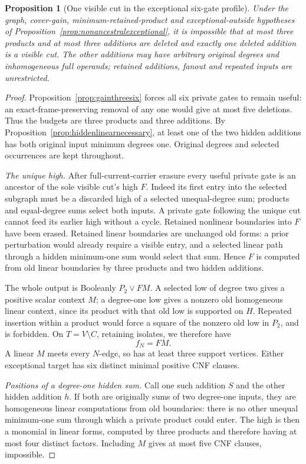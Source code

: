 \documentclass[11pt]{article}
\newtheorem{proposition}[theorem]{Proposition}
\theoremstyle{definition}
\theoremstyle{remark}
\begin{document}
\begin{proposition}[One visible cut in the exceptional six-gate profile]\label{prop:onevisibleexceptional}
Under the graph, cover-gain, minimum-retained-product and exceptional-outside hypotheses of Proposition~\ref{prop:nonancestralexceptional}, it is impossible that at most three products and at most three additions are deleted and exactly one deleted addition is a visible cut. The other additions may have arbitrary original degrees and inhomogeneous full operands; retained additions, fanout and repeated inputs are unrestricted.
\end{proposition}
\begin{proof}
Proposition~\ref{prop:gainthreesix} forces all six private gates to remain useful: an exact-frame-preserving removal of any one would give at most five deletions. Thus the budgets are three products and three additions. By Proposition~\ref{prop:hiddenlinearnecessary}, at least one of the two hidden additions has both original input minimum degrees one. Original degrees and selected occurrences are kept throughout.

\emph{The unique high.} After full-current-carrier erasure every useful private gate is an ancestor of the sole visible cut's high $F$. Indeed its first entry into the selected subgraph must be a discarded high of a selected unequal-degree sum; products and equal-degree sums select both inputs. A private gate following the unique cut cannot feed its earlier high without a cycle. Retained nonlinear boundaries into $F$ have been erased. Retained linear boundaries are unchanged old forms: a prior perturbation would already require a visible entry, and a selected linear path through a hidden minimum-one sum would select that sum. Hence $F$ is computed from old linear boundaries by three products and two hidden additions.

The whole output is Booleanly $P_2\vee FM$. A selected low of degree two gives a positive scalar context $M$; a degree-one low gives a nonzero old homogeneous linear context, since its product with that old low is supported on $H$. Repeated insertion within a product would force a square of the nonzero old low in $P_2$, and is forbidden. On $T=V\setminus C$, retaining isolates, we therefore have
\[
 f_N=FM.                                                        \tag{*}
\]
A linear $M$ meets every $N$-edge, so has at least three support vertices. Either exceptional target has six distinct minimal positive CNF clauses.

\emph{Positions of a degree-one hidden sum.} Call one such addition $S$ and the other hidden addition $h$. If both are originally sums of two degree-one inputs, they are homogeneous linear computations from old boundaries: there is no other unequal minimum-one sum through which a private product could enter. The high is then a monomial in linear forms, computed by three products and therefore having at most four distinct factors. Including $M$ gives at most five CNF clauses, impossible.


\end{proof}
\end{document}
